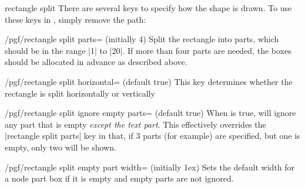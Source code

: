 \begin{shape}{rectangle split}
    There are several \pgfname{} keys to specify how the shape is drawn. To use
    these keys in \tikzname, simply remove the  path:

    \begin{key}{/pgf/rectangle split parts= (initially 4)}
        Split the rectangle into  parts, which should be in the
        range |1| to |20|. If more than four parts are needed, the boxes should
        be allocated in advance as described above.
\begin{codeexample}[preamble={\usetikzlibrary{shapes.multipart}}]
\end{codeexample}
    \end{key}

    \begin{key}{/pgf/rectangle split horizontal= (default true)}
        This key determines whether the rectangle is split horizontally or
        vertically
    \end{key}

    \begin{key}{/pgf/rectangle split ignore empty parts= (default true)}
        When  is true, \pgfname{} will ignore any part that is
        empty \emph{except the text part}. This effectively overrides the
        |rectangle split parts| key in that, if 3 parts (for example) are
        specified, but one is empty, only two will be shown.
\begin{codeexample}[preamble={\usetikzlibrary{shapes.multipart}}]
\end{codeexample}
    \end{key}
    \begin{key}{/pgf/rectangle split empty part width= (initially 1ex)}
        Sets the default width for a node part box if it is empty and empty
        parts are not ignored.
  \end{key}


\end{shape}
